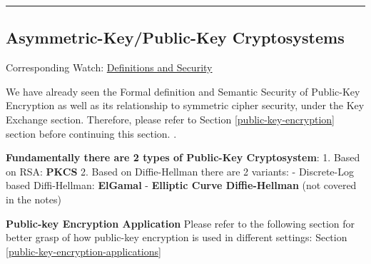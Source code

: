 \documentclass[11pt]{article}
\begin{document}
\begin{center}\rule{0.5\linewidth}{\linethickness}\end{center}

    \hypertarget{asymmetric-keypublic-key-cryptosystems}{%
\subsection{Asymmetric-Key/Public-Key
Cryptosystems}\label{asymmetric-keypublic-key-cryptosystems}}

Corresponding Watch:
\href{https://www.coursera.org/learn/crypto/lecture/qU4Cy/definitions-and-security}{Definitions
and Security}

We have already seen the Formal definition and Semantic Security of
Public-Key Encryption as well as its relationship to symmetric cipher
security, under the Key Exchange section. Therefore, please refer to
Section \ref{public-key-encryption} section before continuing this
section. .

\textbf{Fundamentally there are 2 types of Public-Key Cryptosystem}: 1.
Based on RSA: \textbf{PKCS} 2. Based on Diffie-Hellman there are 2
variants: - Discrete-Log based Diffi-Hellman: \textbf{ElGamal} -
\textbf{Elliptic Curve Diffie-Hellman} (not covered in the notes)

\textbf{Public-key Encryption Application} Please refer to the following
section for better grasp of how public-key encryption is used in
different settings: Section \ref{public-key-encryption-applications}
\end{document}
